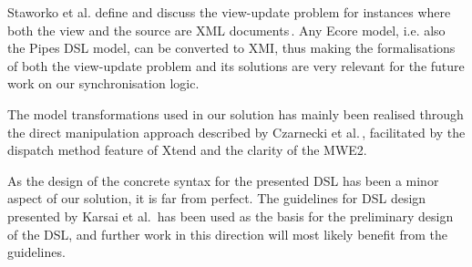 Staworko et al. define and discuss the view-update problem for instances where both the view and the source are XML documents\,\cite{staworko10}. Any Ecore model, i.e. also the Pipes DSL model, can be converted to XMI, thus making the formalisations of both the view-update problem and its solutions are very relevant for the future work on our synchronisation logic.

The model transformations used in our solution has mainly been realised through the direct manipulation approach described by Czarnecki et al.\,\cite{czarnecki06}, facilitated by the dispatch method feature of Xtend and the clarity of the MWE2.

As the design of the concrete syntax for the presented DSL has been a minor aspect of our solution, it is far from perfect. The guidelines for DSL design presented by Karsai et al.\,\cite{karsai09} has been used as the basis for the preliminary design of the DSL, and further work in this direction will most likely benefit from the guidelines.







